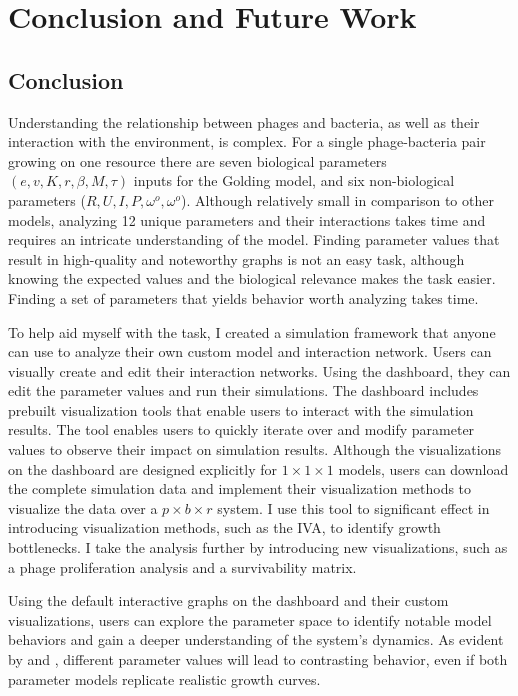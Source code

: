 \chapter{Conclusion and Future Work}
\label{CAFW}

\section{Conclusion}
\label{Conclusion}
Understanding the relationship between phages and bacteria, as well as their interaction with the environment, is complex. 
For a single phage-bacteria pair growing on one resource there are seven biological parameters $(e, v, K, r, \beta, M, \tau)$ inputs for the Golding model, and six non-biological parameters ($R, U, I, P, \omega^o, \omega^o$). 
Although relatively small in comparison to other models, analyzing 12 unique parameters and their interactions takes time and requires an intricate understanding of the model. 
Finding parameter values that result in high-quality and noteworthy graphs is not an easy task, although knowing the expected values and the biological relevance makes the task easier. 
Finding a set of parameters that yields behavior worth analyzing takes time. 

To help aid myself with the task, I created a simulation framework that anyone can use to analyze their own custom model and interaction network. 
Users can visually create and edit their interaction networks. 
Using the dashboard, they can edit the parameter values and run their simulations. 
The dashboard includes prebuilt visualization tools that enable users to interact with the simulation results. 
The tool enables users to quickly iterate over and modify parameter values to observe their impact on simulation results. 
Although the visualizations on the dashboard are designed explicitly for $1\times 1\times 1$ models, users can download the complete simulation data and implement their visualization methods to visualize the data over a $p\times b\times r$ system. 
I use this tool to significant effect in introducing visualization methods, such as the IVA, to identify growth bottlenecks. 
I take the analysis further by introducing new visualizations, such as a phage proliferation analysis and a survivability matrix. 

Using the default interactive graphs on the dashboard and their custom visualizations, users can explore the parameter space to identify notable model behaviors and gain a deeper understanding of the system's dynamics. 
As evident by  and , different parameter values will lead to contrasting behavior, even if both parameter models replicate realistic growth curves. 

